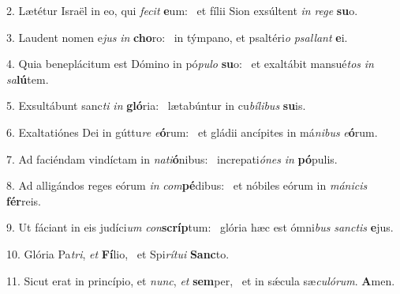 2. Lætétur Israël in eo, qui \textit{fe}\textit{cit} \textbf{e}um: \ast\  et fílii Sion exsúltent \textit{in} \textit{re}\textit{ge} \textbf{su}o.\

3. Laudent nomen e\textit{jus} \textit{in} \textbf{cho}ro: \ast\  in týmpano, et psaltéri\textit{o} \textit{psal}\textit{lant} \textbf{e}i.\

4. Quia beneplácitum est Dómino in pó\textit{pu}\textit{lo} \textbf{su}o: \ast\  et exaltábit mansué\textit{tos} \textit{in} \textit{sa}\textbf{lú}tem.\

5. Exsultábunt sanc\textit{ti} \textit{in} \textbf{gló}ria: \ast\  lætabúntur in cu\textit{bí}\textit{li}\textit{bus} \textbf{su}is.\

6. Exaltatiónes Dei in gúttu\textit{re} \textit{e}\textbf{ó}rum: \ast\  et gládii ancípites in má\textit{ni}\textit{bus} \textit{e}\textbf{ó}rum.\

7. Ad faciéndam vindíctam in \textit{na}\textit{ti}\textbf{ó}nibus: \ast\  increpati\textit{ó}\textit{nes} \textit{in} \textbf{pó}pulis.\

8. Ad alligándos reges eórum \textit{in} \textit{com}\textbf{pé}dibus: \ast\  et nóbiles eórum in \textit{má}\textit{ni}\textit{cis} \textbf{fér}reis.\

9. Ut fáciant in eis judíci\textit{um} \textit{con}\textbf{scríp}tum: \ast\  glória hæc est ómni\textit{bus} \textit{sanc}\textit{tis} \textbf{e}jus.\

10. Glória Pa\textit{tri}, \textit{et} \textbf{Fí}lio, \ast\  et Spi\textit{rí}\textit{tu}\textit{i} \textbf{Sanc}to.\

11. Sicut erat in princípio, et \textit{nunc}, \textit{et} \textbf{sem}per, \ast\  et in sǽcula sæ\textit{cu}\textit{ló}\textit{rum}. \textbf{A}men.\

